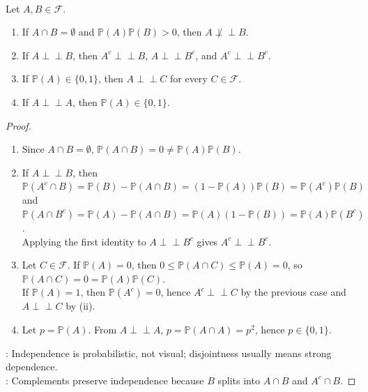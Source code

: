 \begin{proposition} \label{prop:basic-independence-tests} \\
Let $A,B\in\mathcal{F}$.
\begin{enumerate}[label=(\roman*)]
\setlength{\itemsep}{0pt}
\item If $A\cap B=\emptyset$ and $\mathbb{P}(A)\mathbb{P}(B)>0$, then $A\not\perp\!\!\!\perp B$.
\item If $A\perp\!\!\!\perp B$, then $A^c\perp\!\!\!\perp B$, $A\perp\!\!\!\perp B^c$, and $A^c\perp\!\!\!\perp B^c$.
\item If $\mathbb{P}(A)\in\{0,1\}$, then $A\perp\!\!\!\perp C$ for every $C\in\mathcal{F}$.
\item If $A\perp\!\!\!\perp A$, then $\mathbb{P}(A)\in\{0,1\}$.
\end{enumerate}
\begin{proof}
\begin{enumerate}[label=(\roman*)]
\setlength{\itemsep}{0pt}
\item Since $A\cap B=\emptyset$, $\mathbb{P}(A\cap B)=0\neq\mathbb{P}(A)\mathbb{P}(B)$.
\item If $A\perp\!\!\!\perp B$, then $\mathbb{P}(A^c\cap B)=\mathbb{P}(B)-\mathbb{P}(A\cap B)=(1-\mathbb{P}(A))\mathbb{P}(B)=\mathbb{P}(A^c)\mathbb{P}(B)$\\
and $\mathbb{P}(A\cap B^c)=\mathbb{P}(A)-\mathbb{P}(A\cap B)=\mathbb{P}(A)(1-\mathbb{P}(B))=\mathbb{P}(A)\mathbb{P}(B^c)$.\\
Applying the first identity to $A\perp\!\!\!\perp B^c$ gives $A^c\perp\!\!\!\perp B^c$.
\item Let $C\in\mathcal{F}$. If $\mathbb{P}(A)=0$, then $0\leq\mathbb{P}(A\cap C)\leq\mathbb{P}(A)=0$, so $\mathbb{P}(A\cap C)=0=\mathbb{P}(A)\mathbb{P}(C)$.\\
If $\mathbb{P}(A)=1$, then $\mathbb{P}(A^c)=0$, hence $A^c\perp\!\!\!\perp C$ by the previous case and $A\perp\!\!\!\perp C$ by (ii).
\item Let $p=\mathbb{P}(A)$. From $A\perp\!\!\!\perp A$, $p=\mathbb{P}(A\cap A)=p^2$, hence $p\in\{0,1\}$.
\end{enumerate}
: Independence is probabilistic, not visual; disjointness usually means strong dependence.\\
: Complements preserve independence because $B$ splits into $A\cap B$ and $A^c\cap B$.
\end{proof}
\end{proposition}

